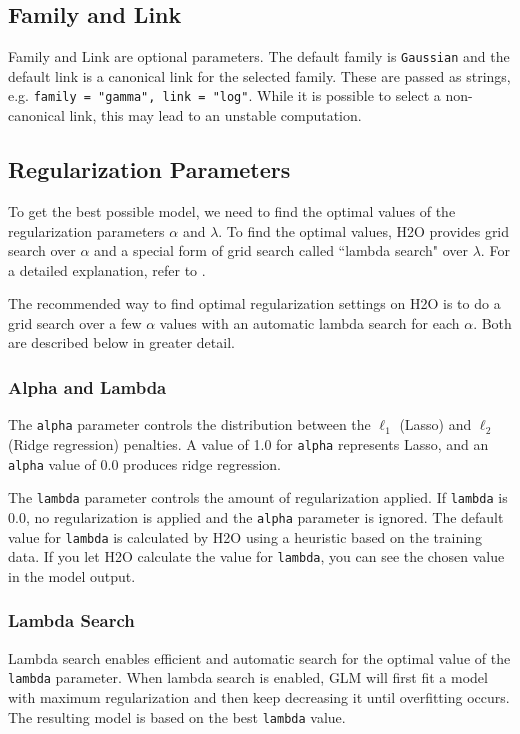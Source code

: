 \subsection{Family and Link}

Family and Link are optional parameters. The default family is \texttt{Gaussian} and the default link is a
canonical link for the selected family. These are passed as strings, e.g. \texttt{family = "gamma", link = "log"}.
While it is possible to select  a non-canonical link, this may lead to an unstable computation. 

\subsection{Regularization Parameters}

To get the best possible model, we need to find the optimal values of the regularization parameters $\alpha$ and
$\lambda$.  To find the optimal values, H2O provides grid search over $\alpha$ and a special form of grid search
called ``lambda search" over $\lambda$. For a detailed explanation, refer to {\textbf{}}.

The recommended way to find optimal regularization settings on H2O is to do
a grid search over a few $\alpha$ values with an automatic lambda search for each $\alpha$. Both are described
below in greater detail.

\subsubsection{Alpha and Lambda}

The \texttt{alpha} parameter controls the distribution between  the $\ell_1$ (Lasso) and  $\ell_2$ (Ridge regression) penalties.  A value of 1.0 for \texttt{alpha} 
 represents Lasso, and an \texttt{alpha} value of 0.0 produces ridge regression.

The \texttt{lambda} parameter controls the amount of regularization applied.  If \texttt{lambda} is 0.0, no 
regularization is applied and the \texttt{alpha} parameter is ignored.  The default value for \texttt{lambda} is
calculated by H2O using a heuristic based on the training data.  If you let H2O calculate the value for \texttt{lambda}, you can see the chosen value in the model output.

\subsubsection{Lambda Search}
Lambda search enables efficient and automatic search for the optimal value of the \texttt{lambda} parameter. When lambda search is enabled, GLM will first fit a model with maximum regularization and then keep decreasing it until overfitting occurs. The resulting model is based on the best \texttt{lambda} value. 

